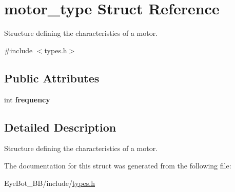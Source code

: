 \hypertarget{structmotor__type}{\section{motor\-\_\-type \-Struct \-Reference}
\label{structmotor__type}
}


\-Structure defining the characteristics of a motor.  




{\ttfamily \#include $<$types.\-h$>$}

\subsection*{\-Public \-Attributes}
\begin{DoxyCompactItemize}
\item 
\hypertarget{structmotor__type_ab4b294d61439cc1a0124b6e6587ca451}{int {\bfseries frequency}}\label{structmotor__type_ab4b294d61439cc1a0124b6e6587ca451}

\end{DoxyCompactItemize}


\subsection{\-Detailed \-Description}
\-Structure defining the characteristics of a motor. 

\-The documentation for this struct was generated from the following file\-:\begin{DoxyCompactItemize}
\item 
\-Eye\-Bot\-\_\-\-B\-B/include/\hyperlink{types_8h}{types.\-h}\end{DoxyCompactItemize}
